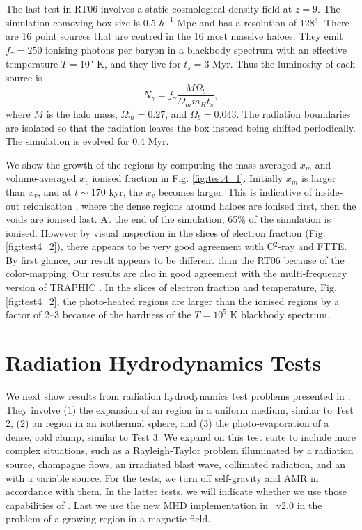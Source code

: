 \documentclass[useAMS,usenatbib]{mn2e}
\begin{document}
The last test in RT06 involves a static cosmological density field at
$z=9$.  The simulation comoving box size is 0.5 $h^{-1}$ Mpc and has a
resolution of 128$^3$.  There are 16 point sources that are centred
in the 16 most massive haloes.  They emit $f_\gamma = 250$ ionising
photons per baryon in a blackbody spectrum with an effective
temperature $T = 10^5$ K, and they live for $t_s = 3$ Myr.  Thus the
luminosity of each source is
%
\begin{equation}
  \label{eqn:cosmo_lum}
  \dot{N}_\gamma = f_\gamma \frac{M \Omega_b} {\Omega_m m_H t_s},
\end{equation}
where $M$ is the halo mass, $\Omega_m = 0.27$, and $\Omega_b =
0.043$.  The radiation boundaries are isolated so that the radiation
leaves the box instead being shifted periodically.  The simulation is
evolved for 0.4 Myr.

We show the growth of the \hii regions by computing the
mass-averaged $x_m$ and volume-averaged $x_v$ ionised fraction in
Fig. \ref{fig:test4_1}.  Initially $x_m$ is larger than $x_v$, and
at $t \sim 170$ kyr, the $x_v$ becomes larger.  This is indicative of
inside-out reionisation \citep[e.g.][]{Gnedin00, Miralda00,
  Sokasian03}, where the dense regions around haloes are ionised first,
then the voids are ionised last.  At the end of the simulation, 65\%
of the simulation is ionised.  However by visual inspection in the
slices of electron fraction (Fig. \ref{fig:test4_2}), there appears to
be very good agreement with C$^2$-ray and FTTE.  By first glance, our
result appears to be different than the RT06 because of the
color-mapping.  Our results are also in good agreement with the
multi-frequency version of TRAPHIC \citep[][see also for better
representations of the electron fraction slices]{Pawlik10}.  In the
slices of electron fraction and temperature, Fig. \ref{fig:test4_2},
the photo-heated regions are larger than the ionised regions by a
factor of 2--3 because of the hardness of the $T = 10^5$ K blackbody
spectrum.

\section{Radiation Hydrodynamics Tests}
\label{sec:radhydro}

We next show results from radiation hydrodynamics test problems
presented in \citet[][hereafter RT09]{Iliev09}.  They involve (1) the
expansion of an \hii region in a uniform medium, similar to Test
2, (2) an \hii region in an isothermal sphere, and (3) the
photo-evaporation of a dense, cold clump, similar to Test 3.  We
expand on this test suite to include more complex situations, such as
a Rayleigh-Taylor problem illuminated by a radiation source, champagne
flows, an irradiated blast wave, collimated radiation, and an
\hii with a variable source.  For the \citeauthor{Iliev09}
tests, we turn off self-gravity and AMR in accordance with them.  In
the latter tests, we will indicate whether we use those capabilities
of \enzo.  Last we use the new MHD implementation in \enzo~v2.0 in the
problem of a growing \hii region in a magnetic field.
\end{document}
